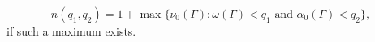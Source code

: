 $$n(q_1, q_2) = 1 + \max\{\nu_0(\Gamma): \omega(\Gamma) < q_1 \text{ and } \alpha_0(\Gamma) < q_2\},$$
if such a maximum exists.
